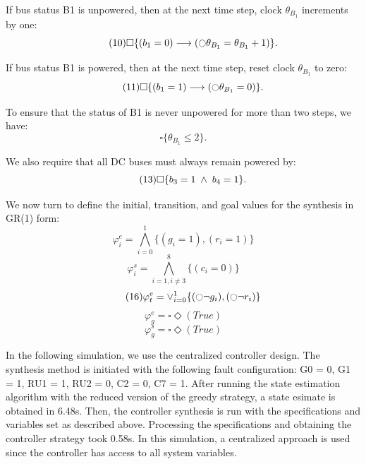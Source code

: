 \documentclass[journal]{IEEEtran}
\newcommand{\always}{\square}
\newcommand{\eventually}{\Diamond}
\renewcommand{\next}{\ocircle}
\newcommand{\aand}{\hspace{1mm}\wedge\hspace{1mm}}
\begin{document}
If bus status B1 is unpowered, then at the next time step, clock $\theta_{B_{1}}$ increments by one:
\begin{equation}\tag{10}
\always \{(b_{1} = 0) \longrightarrow (\next \theta_{B_{1}} = \theta_{B_{1}} + 1)\}.
\end{equation}

If bus status B1 is powered, then at the next time step, reset clock $\theta_{B_{1}}$ to zero:
\begin{equation}\tag{11}
\always \{(b_{1} = 1) \longrightarrow (\next \theta_{B_{1}} = 0)\}.
\end{equation}

To ensure that the status of B1 is never unpowered for more than two steps, we have:
\begin{equation}\tag{12}
\always \{\theta_{B_{1}} \leq 2\}.
\end{equation}

We also require that all DC buses must always remain powered by:
\begin{equation}\tag{13}
\always \{b_{3} = 1 \aand b_{4} = 1\}.
\end{equation}


We now turn to define the initial, transition, and goal values for the synthesis in GR(1) form: 
\begin{equation}\tag{14}
\varphi^{e}_{i} = \bigwedge_{i = 0}^{1} \{ (g_{i} = 1), (r_{i} = 1) \}
\end{equation}
\begin{equation}\tag{15}
\varphi^{s}_{i} = \bigwedge_{i = 1, i \neq 3}^{8} \{ (c_{i} = 0) \}
\end{equation}
\begin{equation}\tag{16}
\varphi^{e}_{t} = \vee_{i = 0}^{1} \{ (\next \lnot g_{i}), (\next \lnot r_{i}) \}
\end{equation}
\begin{equation}\tag{14}
\varphi^{e}_{g} = \always \eventually (True)
\end{equation}
\begin{equation}\tag{15}
\varphi^{s}_{g} = \always \eventually (True)
\end{equation}

In the following simulation, we use the centralized controller design. The synthesis method is initiated with the following fault configuration: G0 = 0, G1 = 1, RU1 = 1, RU2 = 0, C2 = 0, C7 = 1. After running the state estimation algorithm with the reduced version of the greedy strategy, a state esimate is obtained in 6.48s. Then, the controller synthesis is run with the specifications and variables set as described above. Processing the specifications and obtaining the controller strategy took 0.58s. In this simulation, a centralized approach is used since the controller has access to all system variables.
\end{document}
